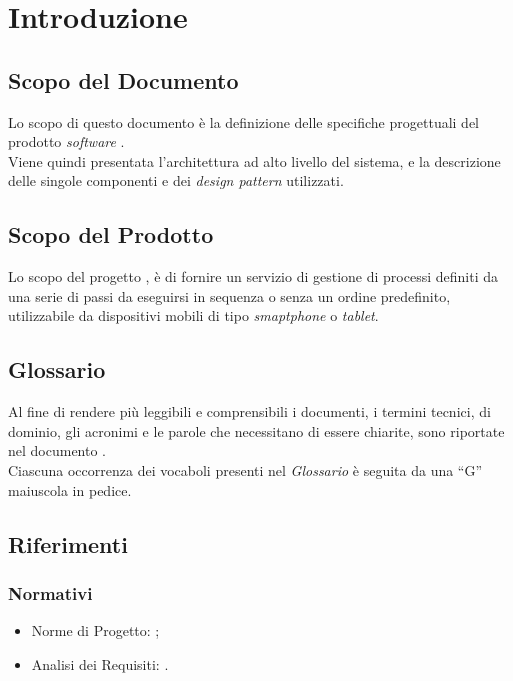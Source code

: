 \section{Introduzione}
\subsection{Scopo del Documento}
Lo scopo di questo documento è la definizione delle specifiche progettuali del prodotto \textit{software} \progetto{}.\\
Viene quindi presentata l'architettura ad alto livello del sistema, e la descrizione delle singole componenti e dei \textit{design pattern} utilizzati.
\subsection{Scopo del Prodotto}
Lo scopo del progetto \progetto{}, è di fornire un servizio di gestione di processi definiti da una serie di passi da eseguirsi in sequenza o senza un ordine predefinito, utilizzabile da dispositivi mobili di tipo \textit{smaptphone} o \textit{tablet}.
\subsection{Glossario}
Al fine di rendere più leggibili e comprensibili i documenti, i termini tecnici, di dominio, gli acronimi e le parole che necessitano di essere chiarite, sono riportate nel documento \Glossario{}.\\
Ciascuna occorrenza dei vocaboli presenti nel \textit{Glossario} è seguita da una ``G'' maiuscola in pedice.
\subsection{Riferimenti}
\subsubsection{Normativi}
\begin{itemize}
\item Norme di Progetto: \NormeDiProgetto{};
\item Analisi dei Requisiti: \AnalisiDeiRequisiti{}.
\end{itemize}
